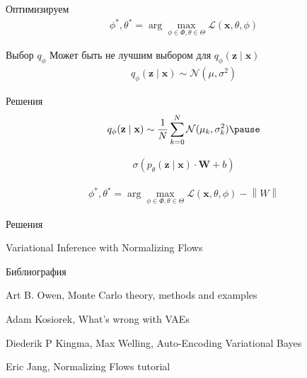 \documentclass{beamer}
\newcommand{\norm}[1]{\left\lVert#1\right\rVert}
\begin{document}
    \begin{frame}{Оптимизируем}
       \begin{align*}
           \phi^*, \theta^* = \arg \max_{\phi \in \Phi, \theta \in \Theta} \mathcal{L}(\mathbf{x}, \theta, \phi)
       \end{align*} 
    \end{frame}

    \begin{frame}{Выбор $q_\phi$}
       Может быть не лучшим выбором для $q_\phi(\mathbf{z} \mid \mathbf{x})$
       \begin{align*}
           q_\phi(\mathbf{z} \mid \mathbf{x}) \sim \mathcal{N}(\mu, \sigma^2)
       \end{align*} 
    \end{frame}

    \begin{frame}{Решения}
        \begin{align*}
            q_\phi(\mathbf{z} \mid \mathbf{x}) \sim \frac{1}{N} \sum^{N}_{k=0} \mathcal{N}(\mu_k, \sigma_k^2)
            \pause
        \end{align*}

        \begin{align*}
            \sigma(p_\theta(\mathbf{z} \mid \mathbf{x}) \cdot \mathbf{W} + b)
        \end{align*}

        \begin{align*}
           \phi^*, \theta^* = \arg \max_{\phi \in \Phi, \theta \in \Theta} \mathcal{L}(\mathbf{x}, \theta, \phi) - \norm{W}
        \end{align*}
    \end{frame}

    \begin{frame}{Решения}
        \begin{thebibliography}{0}
            Variational Inference with Normalizing Flows
        \end{thebibliography}
    \end{frame}
   
    \begin{frame}{Библиография}
        \begin{thebibliography}{9}
            Art B. Owen, Monte Carlo theory, methods and examples
            
            Adam Kosiorek, What's wrong with VAEs

            Diederik P Kingma, Max Welling, Auto-Encoding Variational Bayes

            Eric Jang, Normalizing Flows tutorial
            
        \end{thebibliography}
    \end{frame}
\end{document}
